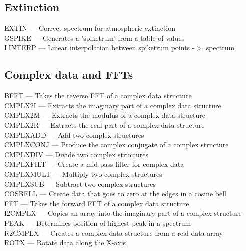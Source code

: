 \documentclass[11pt,twoside]{article}
\newcommand{\htmlref}[2]{#1}
\begin{document}

\subsection{\label{classifextinc}Extinction}

\htmlref{EXTIN}{EXTIN} --- Correct spectrum for atmospheric extinction\\
\htmlref{GSPIKE}{GSPIKE} --- Generates a 'spiketrum' from a table of values\\
\htmlref{LINTERP}{LINTERP} --- Linear interpolation between spiketrum points -$>$ spectrum


\subsection{\label{classifcomplex}Complex data and FFTs}

\htmlref{BFFT}{BFFT} --- Takes the reverse FFT of a complex data structure\\
\htmlref{CMPLX2I}{CMPLX2I} --- Extracts the imaginary part of a complex data structure\\
\htmlref{CMPLX2M}{CMPLX2M} --- Extracts the modulus of a complex data structure\\
\htmlref{CMPLX2R}{CMPLX2R} --- Extracts the real part of a complex data structure\\
\htmlref{CMPLXADD}{CMPLXADD} --- Add two complex structures\\
\htmlref{CMPLXCONJ}{CMPLXCONJ} --- Produce the complex conjugate of a complex structure\\
\htmlref{CMPLXDIV}{CMPLXDIV} --- Divide two complex structures\\
\htmlref{CMPLXFILT}{CMPLXFILT} --- Create a mid-pass filter for complex data\\
\htmlref{CMPLXMULT}{CMPLXMULT} --- Multiply two complex structures\\
\htmlref{CMPLXSUB}{CMPLXSUB} --- Subtract two complex structures\\
\htmlref{COSBELL}{COSBELL} --- Create data that goes to zero at the edges in a cosine bell\\
\htmlref{FFT}{FFT} --- Takes the forward FFT of a complex data structure\\
\htmlref{I2CMPLX}{I2CMPLX} --- Copies an array into the imaginary part of a complex structure\\
\htmlref{PEAK}{PEAK} --- Determines position of highest peak in a spectrum\\
\htmlref{R2CMPLX}{R2CMPLX} --- Creates a complex data structure from a real data array\\
\htmlref{ROTX}{ROTX} --- Rotate data along the X-axis
\end{document}
